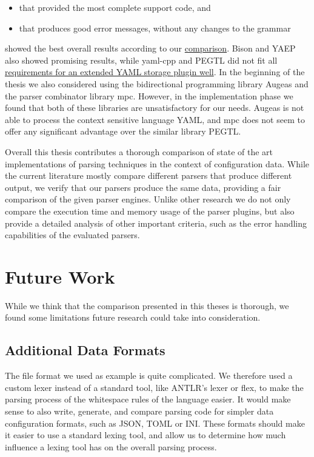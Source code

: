 \begin{itemize}
  \item that provided the most complete support code, and
  \item that produces good error messages, without any changes to the grammar
\end{itemize}

showed the best overall results according to our \hyperref[sec:evaluation]{comparison}. Bison and \gls{YAEP} also showed promising results, while yaml-cpp and PEGTL did not fit all \hyperref[sec:requirements_extended_yaml_plugin]{requirements for an extended YAML storage plugin well}. In the beginning of the thesis we also considered using the bidirectional programming library Augeas and the parser combinator library mpc. However, in the implementation phase we found that both of these libraries are unsatisfactory for our needs. Augeas is not able to process the context sensitive language YAML, and mpc does not seem to offer any significant advantage over the similar library \gls{PEGTL}.

Overall this thesis contributes a thorough comparison of state of the art implementations of parsing techniques in the context of configuration data. While the current literature mostly compare different parsers that produce different output, we verify that our parsers produce the same data, providing a fair comparison of the given parser engines. Unlike other research we do not only compare the execution time and memory usage of the parser plugins, but also provide a detailed analysis of other important criteria, such as the error handling capabilities of the evaluated parsers.

\section{Future Work}

While we think that the comparison presented in this theses is thorough, we found some limitations future research could take into consideration.

\subsection{Additional Data Formats}

The  file format we used as example is quite complicated. We therefore used a custom lexer instead of a standard tool, like ANTLR’s lexer or flex, to make the parsing process of the whitespace rules of the language easier. It would make sense to also write, generate, and compare parsing code for simpler data configuration formats, such as \gls{JSON}, TOML or INI. These formats should make it easier to use a standard lexing tool, and allow us to determine how much influence a lexing tool has on the overall parsing process.

